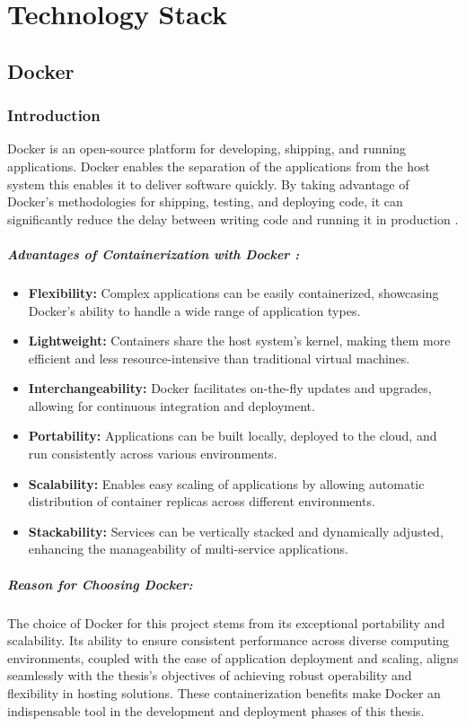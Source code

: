 \chapter{Technology Stack}
\section{Docker}
\subsection{Introduction}
Docker is an open-source platform for developing, shipping, and running applications. Docker enables the separation of the applications from the host system this enables it to deliver software quickly. By taking advantage of Docker's methodologies for shipping, testing, and deploying code, it can significantly reduce the delay between writing code and running it in production \cite{docker_get_started}.

\paragraph{Advantages of Containerization with Docker \cite{iseLecture}:}
\begin{itemize}
    \item \textbf{Flexibility:} Complex applications can be easily containerized, showcasing Docker's ability to handle a wide range of application types.
    \item \textbf{Lightweight:} Containers share the host system's kernel, making them more efficient and less resource-intensive than traditional virtual machines.
    \item \textbf{Interchangeability:} Docker facilitates on-the-fly updates and upgrades, allowing for continuous integration and deployment.
    \item \textbf{Portability:} Applications can be built locally, deployed to the cloud, and run consistently across various environments.
    \item \textbf{Scalability:} Enables easy scaling of applications by allowing automatic distribution of container replicas across different environments.
    \item \textbf{Stackability:} Services can be vertically stacked and dynamically adjusted, enhancing the manageability of multi-service applications.
\end{itemize}

\paragraph{Reason for Choosing Docker:} The choice of Docker for this project stems from its exceptional portability and scalability. Its ability to ensure consistent performance across diverse computing environments, coupled with the ease of application deployment and scaling, aligns seamlessly with the thesis's objectives of achieving robust operability and flexibility in hosting solutions. These containerization benefits make Docker an indispensable tool in the development and deployment phases of this thesis.

